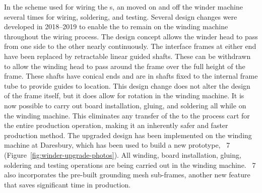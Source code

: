 In the scheme used for wiring the  s, an  moved on and off the winder machine several times for wiring, soldering, and testing. %
 Several design changes were developed in 2018--2019 to enable the  to remain on the winding machine throughout the wiring process. The design concept allows the winder head to pass from one side to the other nearly continuously. The interface frames at either end have been replaced by retractable linear guided shafts. These can be withdrawn to allow the winding head to pass around the frame over the full height of the frame. These shafts have conical ends and are in shafts fixed to the internal frame tube to provide guides to location. This design change does not alter the design of the frame itself, but it does allow for rotation in the winding machine. It is now possible to carry out board installation, gluing, and soldering all while on the winding machine. This eliminates any transfer of the  to the process cart for the entire production operation, making it an inherently safer and faster production method.%
 The upgraded design has been implemented on the winding machine at Daresbury, which has been used to build a new prototype, ~7 (Figure~\ref{fig:winder-upgrade-photos}). All winding, board installation, gluing, soldering and testing operations are being carried out in the winding machine. ~7 also incorporates the pre-built grounding mesh sub-frames, another new feature %
 that saves significant time in production.  


